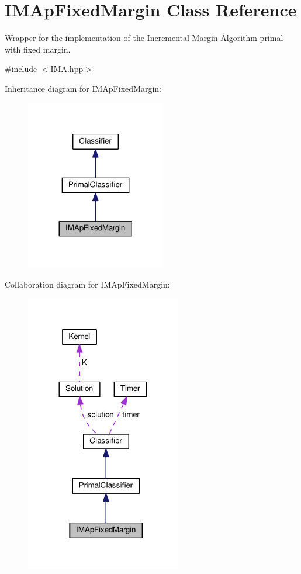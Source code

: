\hypertarget{class_i_m_ap_fixed_margin}{}\section{I\+M\+Ap\+Fixed\+Margin Class Reference}
\label{class_i_m_ap_fixed_margin}


Wrapper for the implementation of the Incremental Margin Algorithm primal with fixed margin.  




{\ttfamily \#include $<$I\+M\+A.\+hpp$>$}



Inheritance diagram for I\+M\+Ap\+Fixed\+Margin\+:\nopagebreak
\begin{figure}[H]
\begin{center}
\leavevmode
\includegraphics[width=173pt]{class_i_m_ap_fixed_margin__inherit__graph}
\end{center}
\end{figure}


Collaboration diagram for I\+M\+Ap\+Fixed\+Margin\+:
\nopagebreak
\begin{figure}[H]
\begin{center}
\leavevmode
\includegraphics[width=192pt]{class_i_m_ap_fixed_margin__coll__graph}
\end{center}
\end{figure}
